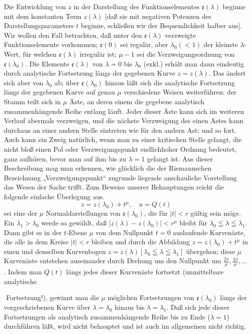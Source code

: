\documentclass{article}
\begin{document}
Die Entwicklung von $z$ in der Darstellung des Funktionselementes $\mathfrak{e}(\lambda)$ beginne mit dem konstanten Term $z(\lambda)$ [daß sie mit negativen Potenzen des Darstellungsparameters $t$ beginne, schließen wir der Bequemlichkeit halber aus]. Wir wollen den Fall betrachten, daß unter den $\mathfrak{e}(\lambda)$ verzweigte Funktionselemente vorkommen; $\mathfrak{e}(0)$ sei regulär, aber $\lambda_0 (< 1)$ der kleinste $\lambda$-Wert, für welchen $\mathfrak{e}(\lambda)$ irregulär ist; $\mu - 1$ sei die Verzweigungsordnung von $\mathfrak{e}(\lambda_0)$. Die Elemente $\mathfrak{e}(\lambda)$ von $\lambda = 0$ bis $\lambda_0$ (exkl.) erhält man dann eindeutig durch analytische Fortsetzung längs der gegebenen Kurve $z = z(\lambda)$. Das ändert sich aber von $\lambda_0$ ab; über $\mathfrak{e}(\lambda_0)$ hinaus läßt sich die analytische Fortsetzung längs der gegebenen Kurve auf genau $\mu$ verschiedene Weisen weiterführen: der Stamm teilt sich in $\mu$ Äste, an deren einem die gegebene analytisch zusammenhängende Reihe entlang läuft. Jeder dieser Äste kann sich im weiteren Verlauf abermals verzweigen, und die nächste Verzweigung des einen Astes kann durchaus an einer andern Stelle eintreten wie für den andern Ast; und so fort. Auch kann ein Zweig natürlich, wenn man zu einer kritischen Stelle gelangt, die nicht bloß einen Pol oder Verzweigungspunkt endlichhoher Ordnung bedeutet, ganz aufhören, bevor man auf ihm bis zu $\lambda = 1$ gelangt ist. Aus dieser Beschreibung mag man erkennen, wie glücklich die der Riemannschen Bezeichnung „Verzweigungspunkt“ zugrunde liegende anschauliche Vorstellung das Wesen der Sache trifft. Zum Beweise unserer Behauptungen reicht die folgende einfache Überlegung aus.
\[ z = z(\lambda_0) + t^\mu, \quad u = Q(t) \]
sei eine der $\mu$ Normaldarstellungen von $\mathfrak{e}(\lambda_0)$, die für $|t| < r$ gültig sein möge. Ein $\lambda_1 > \lambda_0$ werde so gewählt, daß $|z(\lambda) - z(\lambda_0)| < r^\mu$ bleibt für $\lambda_0 \leqq \lambda \leqq \lambda_1$. Dann gibt es in der $t$-Ebene $\mu$ von dem Nullpunkt $t = 0$ auslaufende Kurvenäste, die alle in dem Kreise $|t| < r$ bleiben und durch die Abbildung $z = z(\lambda_0) + t^\mu$ in einen und denselben Kurvenbogen $z = z(\lambda) [\lambda_0 \leqq \lambda \leqq \lambda_1]$ übergehen; diese $\mu$ Kurvenäste entstehen auseinander durch Drehung um den Nullpunkt um $\frac{2\pi}{\mu}, \frac{4\pi}{\mu}, \dots$. Indem man $Q(t)$ längs jedes dieser Kurvenäste fortsetzt (unmittelbare analytische

﻿
Fortsetzung!), gewinnt man die $\mu$ möglichen Fortsetzungen von $\mathfrak{e}(\lambda_0)$ längs der vorgeschriebenen Kurve über $\lambda = \lambda_0$ hinaus bis $\lambda = \lambda_1$. Daß sich jede dieser Fortsetzungen als analytisch zusammenhängende Reihe bis zu Ende ($\lambda = 1$) durchführen läßt, wird nicht behauptet und ist auch im allgemeinen nicht richtig.
\end{document}
